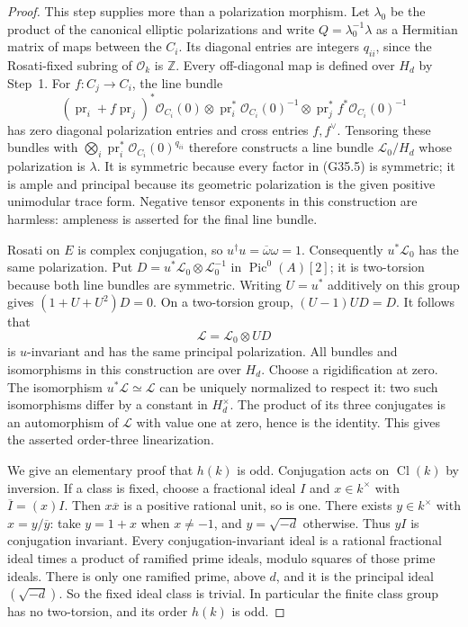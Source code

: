 \begin{proof}
This step supplies more than a polarization morphism.
Let $\lambda_0$ be the product of the canonical elliptic
polarizations and write $Q=\lambda_0^{-1}\lambda$ as a
Hermitian matrix of maps between the $C_i$.
Its diagonal entries are integers $q_{ii}$, since the
Rosati-fixed subring of $\mathcal O_k$ is $\mathbb Z$.
Every off-diagonal map is defined over $H_d$ by Step~1.
For $f:C_j\to C_i$, the line bundle
\[
 (\operatorname{pr}_i+f\operatorname{pr}_j)^*
       \mathcal O_{C_i}(0)
 \otimes\operatorname{pr}_i^*\mathcal O_{C_i}(0)^{-1}
 \otimes\operatorname{pr}_j^*f^*\mathcal O_{C_i}(0)^{-1}
                                                        \tag{G35.5}
\]
has zero diagonal polarization entries and cross entries
$f,f^\vee$.  Tensoring these bundles with
$\bigotimes_i\operatorname{pr}_i^*\mathcal O_{C_i}(0)^{q_{ii}}$
therefore constructs a line bundle $\mathcal L_0/H_d$
whose polarization is $\lambda$.
It is symmetric because every factor in (G35.5) is symmetric;
it is ample and principal because its geometric polarization
is the given positive unimodular trace form.
Negative tensor exponents in this construction are harmless:
ampleness is asserted for the final line bundle.

Rosati on $E$ is complex conjugation, so
$u^\dagger u=\overline\omega\omega=1$.
Consequently $u^*\mathcal L_0$ has the same polarization.
Put $D=u^*\mathcal L_0\otimes\mathcal L_0^{-1}$ in
$\operatorname{Pic}^0(A)[2]$; it is two-torsion because both
line bundles are symmetric.
Writing $U=u^*$ additively on this group gives
$(1+U+U^2)D=0$.
On a two-torsion group, $(U-1)UD=D$.
It follows that
\[
                 \mathcal L=\mathcal L_0\otimes U D
                                                        \tag{G35.6}
\]
is $u$-invariant and has the same principal polarization.
All bundles and isomorphisms in this construction are over
$H_d$.  Choose a rigidification at zero.
The isomorphism $u^*\mathcal L\simeq\mathcal L$ can be
uniquely normalized to respect it: two such isomorphisms
differ by a constant in $H_d^\times$.
The product of its three conjugates is an automorphism of
$\mathcal L$ with value one at zero, hence is the identity.
This gives the asserted order-three linearization.

We give an elementary proof that $h(k)$ is odd.
Conjugation acts on $\operatorname{Cl}(k)$ by inversion.
If a class is fixed, choose a fractional ideal $I$ and
$x\in k^\times$ with $\overline I=(x)I$.
Then $x\overline x$ is a positive rational unit, so is one.
There exists $y\in k^\times$ with $x=y/\overline y$:
take $y=1+x$ when $x\ne-1$, and $y=\sqrt{-d}$ otherwise.
Thus $yI$ is conjugation invariant.
Every conjugation-invariant ideal is a rational fractional
ideal times a product of ramified prime ideals, modulo squares
of those prime ideals.  There is only one ramified prime,
above $d$, and it is the principal ideal $(\sqrt{-d})$.
So the fixed ideal class is trivial.
In particular the finite class group has no two-torsion,
and its order $h(k)$ is odd.


\end{proof}
